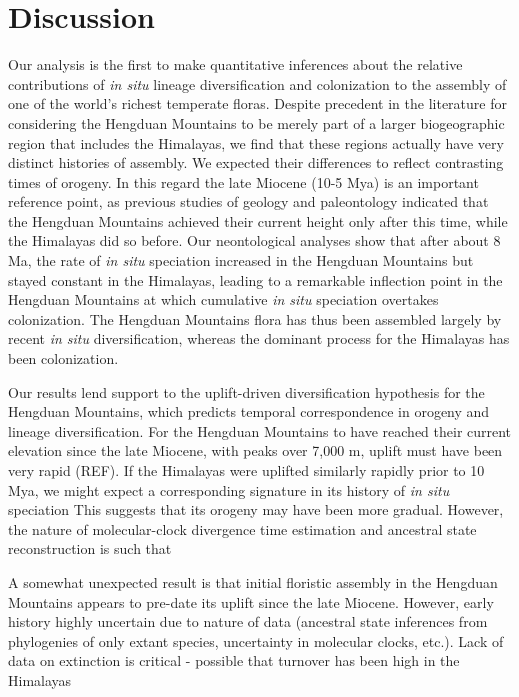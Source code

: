 \section{Discussion}

Our analysis is the first to make quantitative inferences about the relative contributions of \textit{in situ} lineage diversification and colonization to the assembly of one of the world's richest temperate floras. Despite precedent in the literature for considering the Hengduan Mountains to be merely part of a larger biogeographic region that includes the Himalayas, we find that these regions actually have very distinct histories of assembly. We expected their differences to reflect contrasting times of orogeny. In this regard the late Miocene (10-5 Mya) is an important reference point, as previous studies of geology and paleontology indicated that the Hengduan Mountains achieved their current height only after this time, while the Himalayas did so before. Our neontological analyses show that after about 8 Ma, the rate of \textit{in situ} speciation increased in the Hengduan Mountains but stayed constant in the Himalayas, leading to a remarkable inflection point in the Hengduan Mountains at which cumulative \textit{in situ} speciation overtakes colonization. The Hengduan Mountains flora has thus been assembled largely by recent \textit{in situ} diversification, whereas the dominant process for the Himalayas has been colonization.

Our results lend support to the uplift-driven diversification hypothesis for the Hengduan Mountains, which predicts temporal correspondence in orogeny and lineage diversification. For the Hengduan Mountains to have reached their current elevation since the late Miocene, with peaks over 7,000 m, uplift must have been very rapid (REF). If the Himalayas were uplifted similarly rapidly prior to 10 Mya, we might expect a corresponding signature in its history of \textit{in situ} speciation This suggests that its orogeny may have been more gradual. However, the nature of molecular-clock divergence time estimation and ancestral state reconstruction is such that 

A somewhat unexpected result is that initial floristic assembly in the Hengduan Mountains appears to pre-date its uplift since the late Miocene. However, early history highly uncertain due to nature of data (ancestral state inferences from phylogenies of only extant species, uncertainty in molecular clocks, etc.). Lack of data on extinction is critical - possible that turnover has been high in the Himalayas

